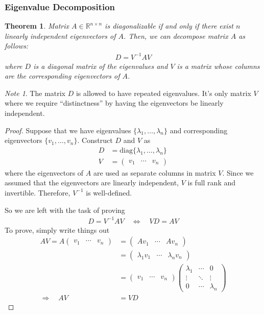 \documentclass[12pt]{article}
\numberwithin{equation}{section} %
\theoremstyle{plain}
\newtheorem{thm}{Theorem}[section]
\theoremstyle{definition}
\theoremstyle{remark}
\newtheorem*{note}{Note}
\newcommand{\diag}{\text{diag}}
\newcommand{\Rnn}{\mathbb{R}^{n\times n}}
\begin{document}
\subsubsection{Eigenvalue Decomposition}
\label{subsec:eigenvaluedecomp}

\begin{thm}
\label{thm:eigendecomp}
Matrix $A\in \Rnn$ is diagonalizable if and only if there exist $n$
linearly independent eigenvectors of $A$. Then, we can decompose matrix
$A$ as follows:
\begin{align*}
  D = V^{-1} A V
\end{align*}
where $D$ is a diagonal matrix of the eigenvalues and $V$ is a matrix
whose columns are the corresponding eigenvectors of $A$.
\end{thm}
\begin{note}
The matrix $D$ is allowed to have repeated eigenvalues. It's only matrix
$V$ where we require ``distinctness'' by having the eigenvectors be
linearly independent.
\end{note}

\begin{proof}
Suppose that we have eigenvalues $\{\lambda_1,\ldots,\lambda_n\}$ and
corresponding eigenvectors $\{v_1,\ldots,v_n\}$.
Construct $D$ and $V$ as
\begin{align*}
  D &= \diag\{\lambda_1, \ldots, \lambda_n\} \\
  V &=
  \begin{pmatrix}
    v_1 & \cdots & v_n
  \end{pmatrix}
\end{align*}
where the eigenvectors of $A$ are used as separate columns in matrix
$V$.  Since we assumed that the eigenvectors are linearly independent,
$V$ is full rank and invertible. Therefore, $V^{-1}$ is well-defined.

So we are left with the task of proving
\begin{align*}
  D = V^{-1} A V
  \quad\Leftrightarrow\quad
  VD = A V
\end{align*}
To prove, simply write things out
\begin{align*}
  AV = A
  \begin{pmatrix}
    v_1 & \cdots & v_n
  \end{pmatrix}
  &=
  \begin{pmatrix}
    Av_1 & \cdots & Av_n
  \end{pmatrix} \\
  &=
  \begin{pmatrix}
    \lambda_1 v_1 & \cdots & \lambda_n v_n
  \end{pmatrix} \\
  &=
  \begin{pmatrix}
    v_1 & \cdots & v_n
  \end{pmatrix}
  \begin{pmatrix}
    \lambda_1 & \cdots & 0 \\
    \vdots & \ddots & \vdots \\
    0 & \cdots & \lambda_n
  \end{pmatrix}\\
  \Rightarrow\quad
  AV &= VD
\end{align*}
\end{proof}
\end{document}
